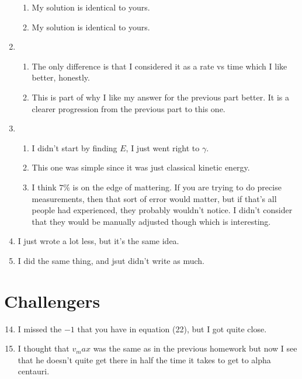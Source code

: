 \documentclass[12pt]{article}
\begin{document}
\begin{enumerate}
\begin{enumerate}
            \item My solution is identical to yours.
            \item My solution is identical to yours.
        \end{enumerate}
        \item \begin{enumerate}
            \item The only difference is that I considered it as a rate vs time which I like better, honestly.
            \item This is part of why I like my answer for the previous part better. It is a clearer progression from the previous part to this one.
        \end{enumerate}
        \item \begin{enumerate}
            \item I didn't start by finding \(E\), I just went right to \(\gamma\).
            \item This one was simple since it was just classical kinetic energy.
            \item I think \(7\%\) is on the edge of mattering. If you are trying to do precise measurements, then that sort of error would matter, but if that's all people had experienced, they probably wouldn't notice. I didn't consider that they would be manually adjusted though which is interesting.
        \end{enumerate}
        \item I just wrote a lot less, but it's the same idea.
        \item I did the same thing, and jsut didn't write as much.
    \end{enumerate}

    \section{Challengers}
    \begin{enumerate}
        \setcounter{enumi}{13}
        \item I missed the \(-1\) that you have in equation (22), but I got quite close.
        \item I thought that \(v_max\) was the same as in the previous homework but now I see that he doesn't quite get there in half the time it takes to get to alpha centauri. 
    \end{enumerate}
\end{document}
